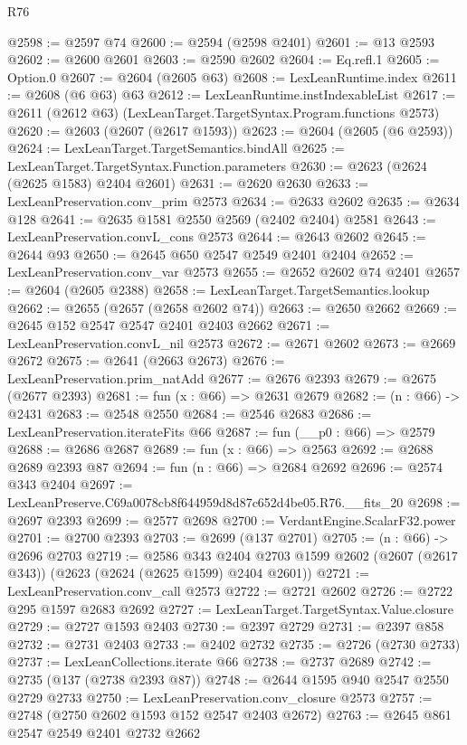\begin{lexlean}{R76}
\begin{coremodule}
@2598 := @2597 @74
@2600 := @2594 (@2598 @2401)
@2601 := @13 @2593
@2602 := @2600 @2601
@2603 := @2590 @2602
@2604 := Eq.refl.{1}
@2605 := Option.{0}
@2607 := @2604 (@2605 @63)
@2608 := LexLeanRuntime.index
@2611 := @2608 (@6 @63) @63
@2612 := LexLeanRuntime.instIndexableList
@2617 := @2611 (@2612 @63) (LexLeanTarget.TargetSyntax.Program.functions @2573)
@2620 := @2603 (@2607 (@2617 @1593))
@2623 := @2604 (@2605 (@6 @2593))
@2624 := LexLeanTarget.TargetSemantics.bindAll
@2625 := LexLeanTarget.TargetSyntax.Function.parameters
@2630 := @2623 (@2624 (@2625 @1583) @2404 @2601)
@2631 := @2620 @2630
@2633 := LexLeanPreservation.conv_prim @2573
@2634 := @2633 @2602
@2635 := @2634 @128
@2641 := @2635 @1581 @2550 @2569 (@2402 @2404) @2581
@2643 := LexLeanPreservation.convL_cons @2573
@2644 := @2643 @2602
@2645 := @2644 @93
@2650 := @2645 @650 @2547 @2549 @2401 @2404
@2652 := LexLeanPreservation.conv_var @2573
@2655 := @2652 @2602 @74 @2401
@2657 := @2604 (@2605 @2388)
@2658 := LexLeanTarget.TargetSemantics.lookup
@2662 := @2655 (@2657 (@2658 @2602 @74))
@2663 := @2650 @2662
@2669 := @2645 @152 @2547 @2547 @2401 @2403 @2662
@2671 := LexLeanPreservation.convL_nil @2573
@2672 := @2671 @2602
@2673 := @2669 @2672
@2675 := @2641 (@2663 @2673)
@2676 := LexLeanPreservation.prim_natAdd
@2677 := @2676 @2393
@2679 := @2675 (@2677 @2393)
@2681 := fun (x : @66) => @2631 @2679
@2682 := (n : @66) -> @2431
@2683 := @2548 @2550
@2684 := @2546 @2683
@2686 := LexLeanPreservation.iterateFits @66
@2687 := fun (__p0 : @66) => @2579
@2688 := @2686 @2687
@2689 := fun (x : @66) => @2563
@2692 := @2688 @2689 @2393 @87
@2694 := fun (n : @66) => @2684 @2692
@2696 := @2574 @343 @2404
@2697 := LexLeanPreserve.C69a0078cb8f644959d8d87c652d4be05.R76.__fits_20
@2698 := @2697 @2393
@2699 := @2577 @2698
@2700 := VerdantEngine.ScalarF32.power
@2701 := @2700 @2393
@2703 := @2699 (@137 @2701)
@2705 := (n : @66) -> @2696 @2703
@2719 := @2586
    @343
    @2404
    @2703
    @1599
    @2602
    (@2607 (@2617 @343))
    (@2623 (@2624 (@2625 @1599) @2404 @2601))
@2721 := LexLeanPreservation.conv_call @2573
@2722 := @2721 @2602
@2726 := @2722 @295 @1597 @2683 @2692
@2727 := LexLeanTarget.TargetSyntax.Value.closure
@2729 := @2727 @1593 @2403
@2730 := @2397 @2729
@2731 := @2397 @858
@2732 := @2731 @2403
@2733 := @2402 @2732
@2735 := @2726 (@2730 @2733)
@2737 := LexLeanCollections.iterate @66
@2738 := @2737 @2689
@2742 := @2735 (@137 (@2738 @2393 @87))
@2748 := @2644 @1595 @940 @2547 @2550 @2729 @2733
@2750 := LexLeanPreservation.conv_closure @2573
@2757 := @2748 (@2750 @2602 @1593 @152 @2547 @2403 @2672)
@2763 := @2645 @861 @2547 @2549 @2401 @2732 @2662

\end{coremodule}
\end{lexlean}
